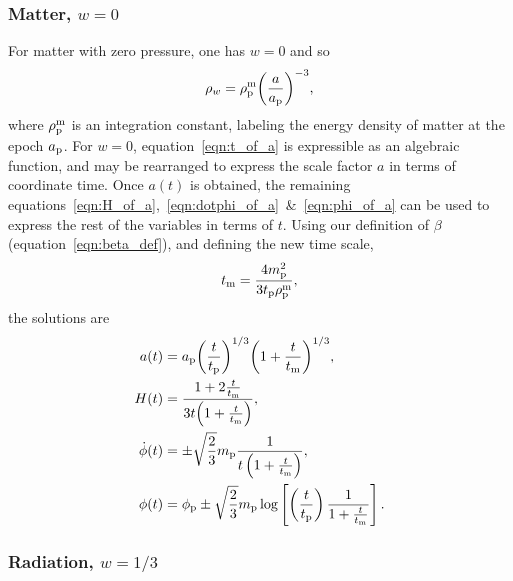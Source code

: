 \subsubsection{Matter, $w=0$}
For matter with zero pressure, one has $w=0$ and so
%
\begin{equation}
  \rho_w = \rho_{\mathrm{p}}^{\mathrm{m}}{\left(\frac{a}{a_{\mathrm{p}}}\right)}^{-3},
\end{equation}
%
where $\rho_{\mathrm{p}}^{\mathrm{m}}$ is an integration constant, labeling the energy density of matter at the epoch $a_{\mathrm{p}}$.  For $w=0$, equation~\eqref{eqn:t_of_a} is expressible as an algebraic function, and may be rearranged to express the scale factor $a$ in terms of coordinate time. Once $a(t)$ is obtained, the remaining equations~\eqref{eqn:H_of_a},~\eqref{eqn:dotphi_of_a}~\&~\eqref{eqn:phi_of_a} can be used to express the rest of the variables in terms of $t$. Using our definition of $\beta$ (equation~\ref{eqn:beta_def}), and defining the new time scale,
%
\begin{equation}
  t_{\mathrm{m}} = \frac{4m_{\mathrm{p}}^2}{3t_{\mathrm{p}}\rho_{\mathrm{p}}^{\mathrm{m}} },
  \label{eqn:tm}
\end{equation}
the solutions are
%
\begin{align}
  a(t)
  &=
  a_{\mathrm{p}}{\left(\frac{t}{t_{\mathrm{p}}}\right)}^{1/3}
  {\left(1+\frac{t}{t_{\mathrm{m}}}\right)}^{1/3} ,
  \\
  H(t) &= 
  \frac{1+2\frac{t}{t_{\mathrm{m}}}}{3t{{\left( 1+\frac{t}{t_{\mathrm{m}}} \right) }}},
  \\
  \dot{\phi}(t) &= 
  \pm\sqrt{\frac{2}{3}}m_{\mathrm{p}}
  \frac{1}
  {t \left( 1+\frac{t}{t_{\mathrm{m}}} \right) },
  \\
  \phi(t) &=
  \phi_{\mathrm{p}} \pm \sqrt{\frac{2}{3}}m_{\mathrm{p}} \log\left[  
  \left(\frac{t}{t_{\mathrm{p}}}\right) 
  \frac {1}{1+\frac{t}{t_{\mathrm{m}}}}  
  \right].
\end{align}
%




\subsubsection{Radiation, $w=1/3$}

